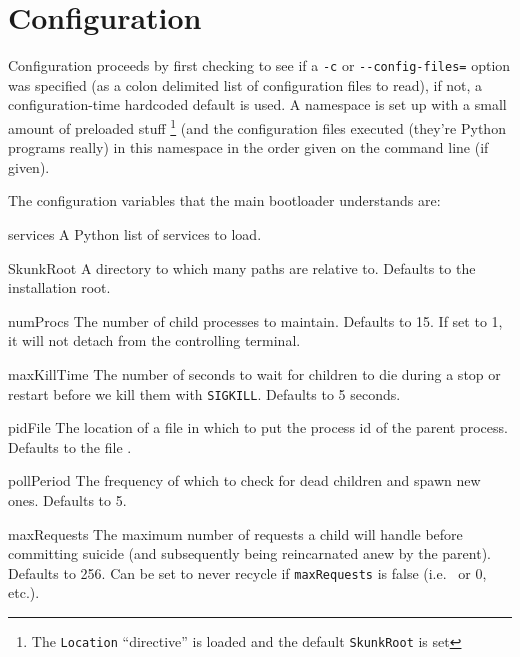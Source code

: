 \documentclass{manual}
\begin{document}
\section{Configuration}
Configuration proceeds by first checking to see if a \verb!-c! or
\verb!--config-files=! option was specified (as a colon delimited list
of configuration files to read), if not, a configuration-time
hardcoded default is used.  A namespace is set up with a small amount
of preloaded stuff \footnote{The \texttt{Location} ``directive'' is loaded and the default \texttt{SkunkRoot} is set}
(and the configuration files executed (they're
Python programs really) in this namespace in the order given on the
command line (if given).


The configuration variables that the main bootloader understands are:

\begin{datadesc}{services}
 A Python list of services to load. \nolocation
\end{datadesc}
\begin{datadesc}{SkunkRoot}
 A directory to which many paths are relative to.
Defaults to the installation root. \nolocation
\end{datadesc}
\begin{datadesc}{numProcs} The number of child processes to maintain.  Defaults
to 15.  If set to 1, it will not detach from the controlling
terminal. \nolocation 
\end{datadesc}
\begin{datadesc}{maxKillTime} The number of seconds to wait for children to die
during a stop or restart before we kill them with \texttt{SIGKILL}.
Defaults to 5 seconds. \nolocation
\end{datadesc}
\begin{datadesc}{pidFile} The location of a file in which to put the process id
of the parent process. 
Defaults to the file . \nolocation
\end{datadesc}
\begin{datadesc}{pollPeriod}  The frequency of which to check for dead children
and spawn new ones.  Defaults to 5. \nolocation
\end{datadesc}
\begin{datadesc}{maxRequests}
The maximum number of requests a child will handle before committing
suicide (and subsequently being reincarnated anew by the parent).
Defaults to 256.  Can be set to never recycle if \texttt{maxRequests}
is false (i.e. \None\ or 0, etc.). \nolocation
\end{datadesc}
\end{document}
